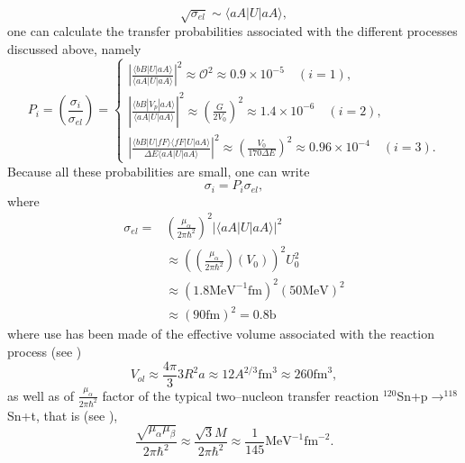 \documentclass[a4paper,14pt]{article}
\begin{document}
\begin{equation}\label{eq_est_17}
\sqrt{\sigma_{el}}\sim \langle aA|U|aA\rangle,
\end{equation}
one can calculate the transfer probabilities associated with the different processes discussed above, namely
\begin{equation}\label{eq_est_18}
P_i=\left(\frac{\sigma_i}{\sigma_{el}}\right)=\left\{
\begin{array}{l}
  \left|\frac{\langle bB|U|aA\rangle}{\langle aA|U|aA\rangle}\right|^2\approx \mathcal{O}^2\approx 0.9 \times 10^{-5}\quad (i=1), \\
  \left|\frac{\langle bB|V_p|aA\rangle}{\langle aA|U|aA\rangle}\right|^2\approx \left(\frac{G}{2V_0}\right)^2\approx 1.4 \times 10^{-6}\quad (i=2), \\
    \left|\frac{\langle bB|U|fF\rangle\langle fF|U|aA\rangle}{\Delta E\langle aA|U|aA\rangle}\right|^2\approx \left(\frac{V_0}{170\Delta E}\right)^2\approx 0.96 \times 10^{-4}\quad (i=3).
\end{array}
\right.
\end{equation}
Because all these probabilities are small, one can write
\begin{equation}\label{eq_est_19}
\sigma_i=P_i\sigma_{el},
\end{equation}
where
\begin{equation}\label{eq_est_20}
\begin{split}
\sigma_{el}=&\left(\frac{\mu_\alpha}{2\pi\hbar^2}\right)^2|\langle aA|U|aA\rangle|^2\\
&\approx \left(\left(\frac{\mu_\alpha}{2\pi\hbar^2}\right)(V_0)\right)^2U_0^2\\
&\approx \left( 1.8 \text{MeV}^{-1}\text{fm}\right)^2 \left( 50 \text{MeV}\right)^2 \\
&\approx \left( 90\text{fm}\right)^2 =0.8 \text{b}
\end{split}
\end{equation}
where use has been made of the effective volume associated with the reaction process (see   )
\begin{equation}\label{eq_est_21}
V_{ol}\approx \frac{4\pi}{3}3R^2a\approx 12 A^{2/3} \text{fm}^3\approx 260 \text{fm}^3,
\end{equation}
as well as of $\frac{\mu_\alpha}{2\pi\hbar^2}$ factor of the typical two--nucleon transfer reaction $^{120}$Sn+p$\rightarrow ^{118}$Sn+t, that is (see  ),
\begin{equation}\label{eq_est_22}
\frac{\sqrt{\mu_\alpha\mu_\beta}}{2\pi\hbar^2}\approx \frac{\sqrt{3}M}{2\pi\hbar^2}\approx \frac{1}{145} \text{MeV}^{-1}\text{fm}^{-2}.
\end{equation}
\end{document}
